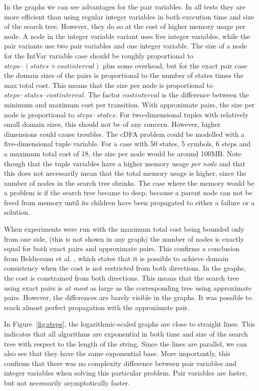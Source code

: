 \documentclass[a4paper,11pt]{article}
\begin{document}
In the graphs we can see advantages for the pair variables. In all tests they are more efficient than using regular integer variables in both execution time and size of the search tree. However, they do so at the cost of higher memory usage per node. A node in the integer variable variant uses five integer variables, while the pair variants use two pair variables and one integer variable. The size of a node for the IntVar variable case should be roughly proportional to $\mathit{steps}\cdot (\mathit{states} + \mathit{costinterval})$ plus some overhead, but for the exact pair case the domain sizes of the pairs is proportional to the number of states times the max total cost. This means that the size per node is proportional to $\mathit{steps}\cdot \mathit{states}\cdot \mathit{costinterval}$. The factor $\mathit{costinterval}$ is the difference between the minimum and maximum cost per transition. With approximate pairs, the size per node is proportional to $\mathit{steps}\cdot \mathit{states}$. For two-dimensional tuples with relatively small domain sizes, this should not be of any concern. However, higher dimensions could cause troubles. The cDFA problem could be modelled with a five-dimensional tuple variable. For a case with 50 states, 5 symbols, 6 steps and a maximum total cost of 18, the size per node would be around 100MB. Note though that the tuple variables have a higher memory usage \textit{per node} and that this does not necessarily mean that the total memory usage is higher, since the number of nodes in the search tree shrinks. The case where the memory would be a problem is if the search tree became to deep, because a parent node can not be freed from memory until its children have been propagated to either a failure or a solution.

When experiments were run with the maximum total cost being bounded only from one side, (this is not shown in any graph) the number of nodes is exactly equal for both exact pairs and approximate pairs. This confirms a conclusion from Beldiceanu et al. \cite{Beldiceanu675954}, which states that it is possible to achieve domain consistency when the cost is not restricted from both directions. In the graphs, the cost is constrained from both directions. This means that the search tree using exact pairs is \textit{at most} as large as the corresponding tree using approximate pairs. However, the differences are barely visible in the graphs. It was possible to reach almost perfect propagation with the approximate pair.

In Figure~\ref{fig:steps}, the logarithmic-scaled graphs are close to straight lines. This indicates that all algorithms are exponential in both time and size of the search tree with respect to the length of the string. Since the lines are parallel, we can also see that they have the same exponential base. More importantly, this confirms that there was no complexity difference between pair variables and integer variables when solving this particular problem. Pair variables are faster, but not necessarily asymptotically faster. 
\end{document}
